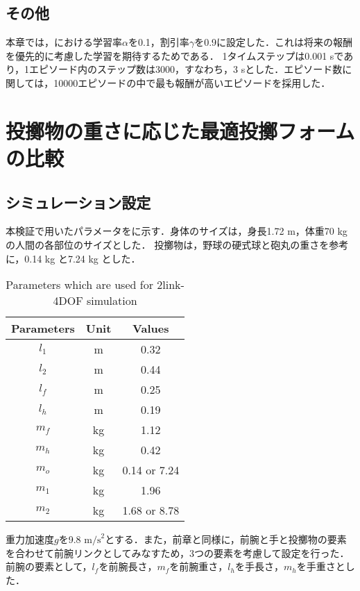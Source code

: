 \subsection{その他}
本章では，における学習率$\alpha$を0.1，割引率$\gamma$を0.9に設定した．これは将来の報酬を優先的に考慮した学習を期待するためである．
1タイムステップは0.001 sであり，1エピソード内のステップ数は3000，すなわち，3 sとした．エピソード数に関しては，10000エピソードの中で最も報酬が高いエピソードを採用した．

\section{投擲物の重さに応じた最適投擲フォームの比較}
\subsection{シミュレーション設定}
本検証で用いたパラメータをに示す．身体のサイズは，身長1.72 m，体重70 kgの人間の各部位のサイズとした．
投擲物は，野球の硬式球と砲丸の重さを参考に，0.14 kg と7.24 kg とした．
\begin{table}[tb]
  \begin{center}
    \caption{Parameters which are used for 2link-4DOF simulation}

    \begin{tabular}{c|c|c}
      \hline
      Parameters & Unit & Values \\
      \hline
      $l_{1}$ & m & 0.32 \\
      $l_{2}$ & m & 0.44 \\
      $l_{f}$ & m & 0.25 \\
      $l_{h}$ & m & 0.19 \\
      $m_{f}$ & kg & 1.12 \\
      $m_{h}$ & kg & 0.42 \\
      $m_{o}$ & kg & 0.14 or 7.24 \\
      $m_{1}$ & kg & 1.96 \\
      $m_{2}$ & kg & 1.68 or 8.78 \\
      \hline
    \end{tabular}
  \end{center}
\end{table}
重力加速度$g$を9.8 $\mathrm{m/s}^{2}$とする．また，前章と同様に，前腕と手と投擲物の要素を合わせて前腕リンクとしてみなすため，3つの要素を考慮して設定を行った．
前腕の要素として，$l_{f}$を前腕長さ，$m_{f}$を前腕重さ，$l_{h}$を手長さ，$m_{h}$を手重さとした．\\

